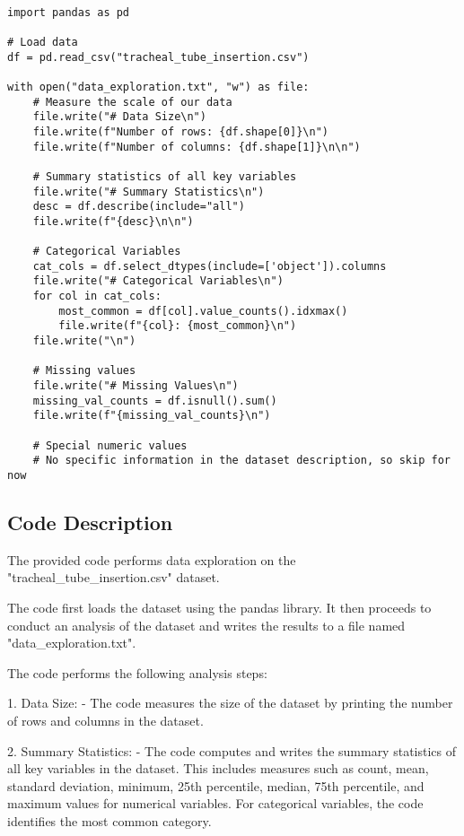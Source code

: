 \documentclass[11pt]{article}
\begin{document}
\begin{verbatim}

import pandas as pd

# Load data
df = pd.read_csv("tracheal_tube_insertion.csv")

with open("data_exploration.txt", "w") as file:
    # Measure the scale of our data
    file.write("# Data Size\n")
    file.write(f"Number of rows: {df.shape[0]}\n")
    file.write(f"Number of columns: {df.shape[1]}\n\n")

    # Summary statistics of all key variables
    file.write("# Summary Statistics\n")
    desc = df.describe(include="all")
    file.write(f"{desc}\n\n")
    
    # Categorical Variables
    cat_cols = df.select_dtypes(include=['object']).columns
    file.write("# Categorical Variables\n")
    for col in cat_cols:
        most_common = df[col].value_counts().idxmax()
        file.write(f"{col}: {most_common}\n")
    file.write("\n")
    
    # Missing values
    file.write("# Missing Values\n")
    missing_val_counts = df.isnull().sum()
    file.write(f"{missing_val_counts}\n")
    
    # Special numeric values
    # No specific information in the dataset description, so skip for now

\end{verbatim}

\subsection{Code Description}

The provided code performs data exploration on the "tracheal\_tube\_insertion.csv" dataset. 

The code first loads the dataset using the pandas library. It then proceeds to conduct an analysis of the dataset and writes the results to a file named "data\_exploration.txt".

The code performs the following analysis steps:

1. Data Size:
   - The code measures the size of the dataset by printing the number of rows and columns in the dataset.

2. Summary Statistics:
   - The code computes and writes the summary statistics of all key variables in the dataset. This includes measures such as count, mean, standard deviation, minimum, 25th percentile, median, 75th percentile, and maximum values for numerical variables. For categorical variables, the code identifies the most common category.
\end{document}
